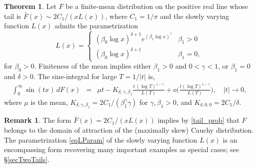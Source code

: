 \documentclass[11pt]{article}
\theoremstyle{definition}
\newtheorem{theorem}{Theorem}[section]
\newtheorem{remark}{Remark}[section]
\begin{document}
\begin{theorem}\label{thmSinIntegral}
	Let $F$ be a finite-mean distribution on the positive real line whose tail is $\bar F(x) \sim 2C_1/(x L(x))$, where $C_1=1/\pi$ and the slowly varying function $L(x)$ admits the parametrization
	\begin{equation}\label{eqLParam}
	L(x) = \left\{ \begin{array}{ll}(\beta_0\log x)^{\delta + 1} e^{(\beta_1\log x)^\gamma} & \beta_1> 0 \\
	(\beta_0\log x)^{\delta + 1} & \beta_1 = 0,
	\end{array}\right.
	\end{equation}
	for $\beta_0>0$. Finiteness of the mean implies either $\beta_1>0$ and $0 < \gamma < 1$,	or $\beta_1 = 0$ and $\delta > 0$. The sine-integral for large $T = 1/|t|$ is,
	\begin{eqnarray*}
		\int_0^\infty \sin (t x)  \, dF(x) 
		&=& \mu t - K_{\delta,\gamma,\beta_1}  \frac{t\,(\log T)^{1-\gamma}} {L(T)} +o\biggl(\frac {t (\log T)^{1-\gamma}} {L(T)} \biggr), \quad |t|\rightarrow 0,
	\end{eqnarray*}
	where $\mu$ is the mean, $K_{\delta,\gamma, \beta_1} = 2C_1/ (\beta_1^{\gamma}\gamma)$ for $\gamma, \beta_1 > 0$, and $K_{\delta,0,0} = 2C_1/\delta$.
\end{theorem}




\begin{remark}\label{remarkMaxSk}
	The form $\bar F(x) = 2C_1/(x L(x))$ implies by \eqref{tail_prob} that $F$ belongs to the domain of attraction of the (maximally skew) Cauchy distribution. The parametrization \eqref{eqLParam} of the slowly varying function $L(x)$ is an encompassing form recovering many important examples as special cases; see \S \ref{secTwoTails}.
\end{remark}
\end{document}
